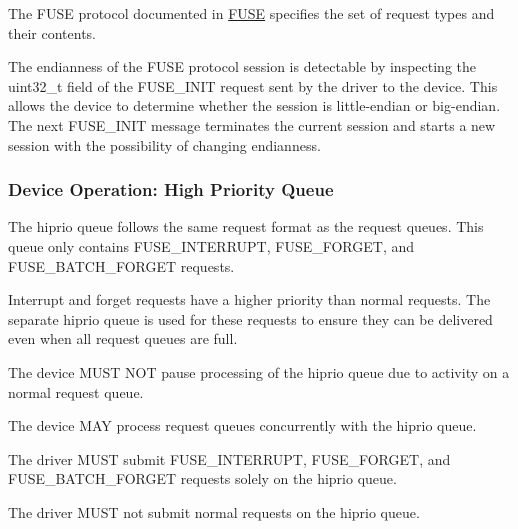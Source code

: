 The FUSE protocol documented in \hyperref[intro:FUSE]{FUSE} specifies the set
of request types and their contents.

The endianness of the FUSE protocol session is detectable by inspecting the
uint32\_t  field of the FUSE\_INIT request sent by the driver
to the device.  This allows the device to determine whether the session is
little-endian or big-endian.  The next FUSE\_INIT message terminates the
current session and starts a new session with the possibility of changing
endianness.

\subsubsection{Device Operation: High Priority Queue}\label{sec:Device Types / File System Device / Device Operation / Device Operation: High Priority Queue}

The hiprio queue follows the same request format as the request queues.  This
queue only contains FUSE\_INTERRUPT, FUSE\_FORGET, and FUSE\_BATCH\_FORGET
requests.

Interrupt and forget requests have a higher priority than normal requests.  The
separate hiprio queue is used for these requests to ensure they can be
delivered even when all request queues are full.


The device MUST NOT pause processing of the hiprio queue due to activity on a
normal request queue.

The device MAY process request queues concurrently with the hiprio queue.


The driver MUST submit FUSE\_INTERRUPT, FUSE\_FORGET, and FUSE\_BATCH\_FORGET requests solely on the hiprio queue.

The driver MUST not submit normal requests on the hiprio queue.

